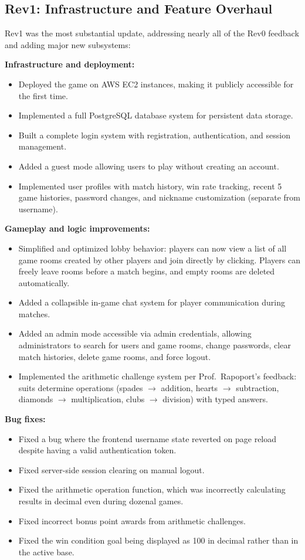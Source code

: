 \documentclass{article}
\begin{document}
\subsection{Rev1: Infrastructure and Feature Overhaul}

Rev1 was the most substantial update, addressing nearly all of the Rev0 feedback and adding major new subsystems:

\textbf{Infrastructure and deployment:}
\begin{itemize}
  \item Deployed the game on AWS EC2 instances, making it publicly accessible for the first time.
  \item Implemented a full PostgreSQL database system for persistent data storage.
  \item Built a complete login system with registration, authentication, and session management.
  \item Added a guest mode allowing users to play without creating an account.
  \item Implemented user profiles with match history, win rate tracking, recent 5 game histories, password changes, and nickname customization (separate from username).
\end{itemize}

\textbf{Gameplay and logic improvements:}
\begin{itemize}
  \item Simplified and optimized lobby behavior: players can now view a list of all game rooms created by other players and join directly by clicking. Players can freely leave rooms before a match begins, and empty rooms are deleted automatically.
  \item Added a collapsible in-game chat system for player communication during matches.
  \item Added an admin mode accessible via admin credentials, allowing administrators to search for users and game rooms, change passwords, clear match histories, delete game rooms, and force logout.
  \item Implemented the arithmetic challenge system per Prof.\ Rapoport's feedback: suits determine operations (spades $\rightarrow$ addition, hearts $\rightarrow$ subtraction, diamonds $\rightarrow$ multiplication, clubs $\rightarrow$ division) with typed answers.
\end{itemize}

\textbf{Bug fixes:}
\begin{itemize}
  \item Fixed a bug where the frontend username state reverted on page reload despite having a valid authentication token.
  \item Fixed server-side session clearing on manual logout.
  \item Fixed the arithmetic operation function, which was incorrectly calculating results in decimal even during dozenal games.
  \item Fixed incorrect bonus point awards from arithmetic challenges.
  \item Fixed the win condition goal being displayed as 100 in decimal rather than in the active base.
\end{itemize}
\end{document}
